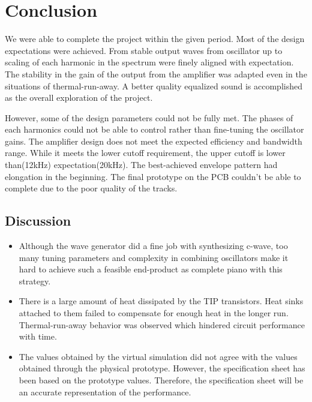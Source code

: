 \section{Conclusion}
We were able to complete the project within the given period. Most of the design expectations were achieved. From stable output waves from oscillator up to scaling of each harmonic in the spectrum were finely aligned with expectation. The stability in the gain of the output from the amplifier was adapted even in the situations of thermal-run-away. A better quality equalized sound is accomplished as the overall exploration of the project. 
\par
However, some of the design parameters could not be fully met. The phases of each harmonics could not be able to control rather than fine-tuning the oscillator gains. The amplifier design does not meet the expected efficiency and bandwidth range. While it meets the lower cutoff requirement, the upper cutoff is lower than(12kHz) expectation(20kHz). The best-achieved envelope pattern had elongation in the beginning. The final prototype on the PCB couldn't be able to complete due to the poor quality of the tracks.
\subsection*{Discussion}
\begin{itemize}
    \item Although the wave generator did a fine job with synthesizing c-wave, too many tuning parameters and complexity in combining oscillators make it hard to achieve such a feasible end-product as complete piano with this strategy.
    \item There is a large amount of heat dissipated by the TIP transistors. Heat sinks attached to them failed to compensate for enough heat in the longer run. Thermal-run-away behavior was observed which hindered circuit performance with time. 
    \item The values obtained by the virtual simulation did not agree with the values obtained through the physical prototype. However, the specification sheet has been based on the prototype values. Therefore, the specification sheet will be an accurate representation of the performance.
\end{itemize}
\onecolumn
